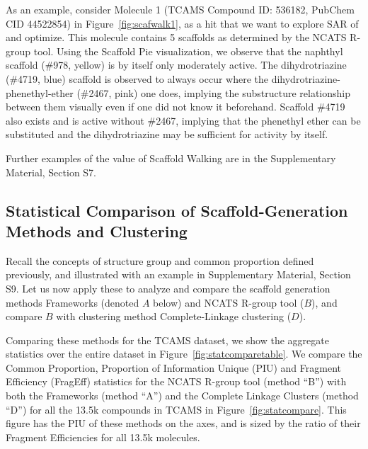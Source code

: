 \documentclass[journal=jacsat,biochem,manuscript=article]{achemso}
\newcommand*\fref[1]{Figure~\ref{fig:#1}}
\begin{document}
As an example, consider Molecule 1 (TCAMS Compound ID: 536182, PubChem CID 44522854) in \fref{scafwalk1}, as a hit that we want to explore SAR of and optimize. This molecule contains 5 scaffolds as determined by the NCATS R-group tool. Using the Scaffold Pie visualization, we observe that the naphthyl scaffold (\#978, yellow) is by itself only moderately active.  The dihydrotriazine (\#4719, blue) scaffold is observed to always occur where the dihydrotriazine-phenethyl-ether (\#2467, pink) one does, implying the substructure relationship between them visually even if one did not know it beforehand. Scaffold \#4719 also exists and is active without \#2467, implying that the phenethyl ether can be substituted and the dihydrotriazine may be sufficient for activity by itself.

Further examples of the value of Scaffold Walking are in the Supplementary Material, Section S7.

\subsection{Statistical Comparison of Scaffold-Generation Methods and Clustering}\label{sec:statcomp}

Recall the concepts of structure group and common proportion defined
previously, and illustrated with an example in Supplementary Material,
Section S9.  Let us now apply these to analyze and compare the
scaffold generation methods Frameworks (denoted $A$ below) and NCATS
R-group tool ($B$), and compare $B$ with clustering method
Complete-Linkage clustering ($D$).

Comparing these methods for the TCAMS dataset, we show the aggregate
statistics over the entire dataset in \fref{statcomparetable}.  We
compare the Common Proportion, Proportion of Information Unique (PIU)
and Fragment Efficiency (FragEff) statistics for the NCATS R-group
tool (method ``B'') with both the Frameworks (method ``A'') and the
Complete Linkage Clusters (method ``D'') for all the 13.5k compounds
in TCAMS in \fref{statcompare}.  This figure has the PIU of these
methods on the axes, and is sized by the ratio of their Fragment
Efficiencies for all 13.5k molecules.
\end{document}
